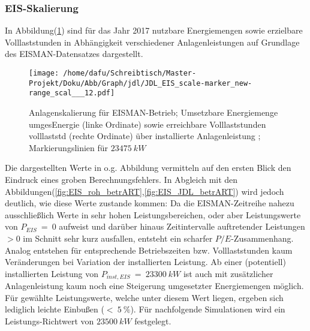\documentclass[onecolumn,10pt,titlepage]{article}
\begin{document}
\subsubsection{EIS-Skalierung}
In Abbildung(\ref{fig:Skal_EIS}) sind für das Jahr 2017 nutzbare Energiemengen sowie erzielbare Volllaststunden in Abhängigkeit verschiedener Anlagenleistungen auf Grundlage des EISMAN-Datensatzes dargestellt.
\begin{figure}[H]

	\centering
	\texttt{[image: /home/dafu/Schreibtisch/Master-Projekt/Doku/Abb/Graph/jdl/JDL\_EIS\_scale-marker\_new-range\_scal\_\_\_12.pdf]}
	\caption[Anlagenskalierung für EISMAN-Betrieb]{Anlagenskalierung für EISMAN-Betrieb; Umsetzbare Energiemenge \gls{umgesEnergie} (linke Ordinate) sowie erreichbare Volllaststunden \gls{volllaststd} (rechte Ordinate) über installierte Anlagenleistung ; Markierungslinien für $23475~kW$}
	\label{fig:Skal_EIS}
\end{figure}
Die dargestellten Werte in o.g. Abbildung vermitteln auf den ersten Blick den Eindruck eines groben Berechnungsfehlers. In Abgleich mit den Abbildungen(\ref{fig:EIS_roh_betrART},\ref{fig:EIS_JDL_betrART}) wird jedoch deutlich, wie diese Werte zustande kommen: Da die EISMAN-Zeitreihe nahezu ausschließlich Werte in sehr hohen Leistungsbereichen, oder aber Leistungswerte von $P_{EIS}~=~0$ aufweist und darüber hinaus Zeitintervalle auftretender Leistungen $>0$ im Schnitt sehr kurz ausfallen, entsteht ein scharfer $P/E$-Zusammenhang. Analog entstehen für entsprechende Betriebszeiten bzw. Volllaststunden kaum Veränderungen bei Variation der installierten Leistung. Ab einer (potentiell) installierten Leistung von $P_{inst,EIS} ~=~23300~ kW$ ist auch mit zusätzlicher Anlagenleistung kaum noch eine Steigerung umgesetzter Energiemengen möglich. Für gewählte Leistungswerte, welche unter diesem Wert liegen, ergeben sich lediglich leichte Einbußen ($< ~5~\%$). Für nachfolgende Simulationen wird ein Leistungs-Richtwert von $23500~kW$ festgelegt.
\end{document}
